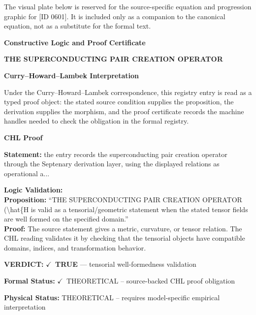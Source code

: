 \begingroup\footnotesize\sloppy
The visual plate below is reserved for the source-specific equation and progression graphic for [ID 0601]. It is included only as a companion to the canonical equation, not as a substitute for the formal text.
\par\endgroup
\ifTZPDarkEdition
{}
\fi

\clearpage
\begingroup\tzpsupportsetup
\noindent\textbf{\fontsize{10.8pt}{12.8pt}\selectfont [ID 0601] Constructive Logic and Proof Certificate}\par
\noindent\textbf{\fontsize{10pt}{12pt}\selectfont THE SUPERCONDUCTING PAIR CREATION OPERATOR}\par
\vspace{0.45em}
\begingroup
\footnotesize
\setlength{\parskip}{0.22em}
\setlength{\parindent}{0pt}
\noindent\textbf{Curry--Howard--Lambek Interpretation}\par
Under the Curry--Howard--Lambek correspondence, this registry entry is read as a typed proof
object: the stated source condition supplies the proposition, the derivation supplies the
morphism, and the proof certificate records the machine handles needed to check the obligation
in the formal registry.

\vspace{0.45em}
\noindent\textbf{CHL Proof}\par
\textbf{Statement:} the entry records the superconducting pair creation operator through the Septenary
derivation layer, using the displayed relations as operational a...

\textbf{Logic Validation:}\\
\textbf{Proposition:} ``THE SUPERCONDUCTING PAIR CREATION OPERATOR (\textbackslash{}hat\{H is valid as a tensorial/geometric
statement when the stated tensor fields are well formed on the specified domain.''\\
\textbf{Proof:} The source statement gives a metric, curvature, or tensor relation. The CHL reading
validates it by checking that the tensorial objects have compatible domains, indices,
and transformation behavior.

\textbf{VERDICT:} \ensuremath{\checkmark}\ \textbf{TRUE} --- tensorial well-formedness validation

\textbf{Formal Status:} \ensuremath{\checkmark}\ THEORETICAL -- source-backed CHL proof obligation

\textbf{Physical Status:} THEORETICAL -- requires model-specific empirical interpretation
\par\vspace{0.45em}
\par
\ifTZPDarkEdition
{}
\fi
\endgroup
\endgroup
